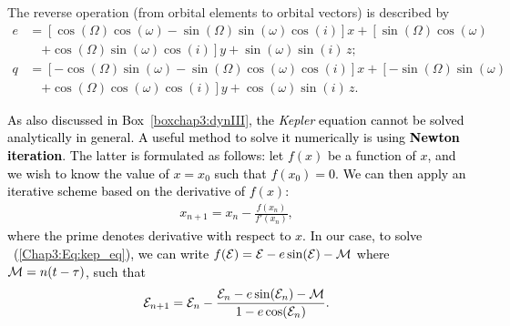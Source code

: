 \documentclass[main.tex]{subfiles}
\begin{document}
\begin{tcolorbox}[sharp corners, colback=green!30, colframe=green!80!blue, title=Box \refstepcounter{educhap3}\label{boxchap3:dynIV}\ref{boxchap3:dynIV} -- Orbital Dynamics IV]
{%
The reverse operation (from orbital elements to orbital vectors) is described by
\begin{subequations}
\label{Chap3:Eq:elements_to_vec}
\begin{align}
\nonumber \unit{e} &= \left [ \cos(\Omega) \cos(\omega) - \sin(\Omega) \sin(\omega) \cos(i) \right ] \unit{x} + \left [ \sin(\Omega) \cos(\omega) \right. \\
&\quad \left. + \cos(\Omega) \sin(\omega) \cos(i) \right ] \unit{y} + \sin(\omega) \sin(i) \, \unit{z}; \\
\nonumber \unit{q} &= \left [ -\cos(\Omega) \sin(\omega) - \sin(\Omega) \cos(\omega) \cos(i) \right ] \unit{x} + \left [ -\sin(\Omega) \sin(\omega) \right. \\
&\quad \left. + \cos(\Omega) \cos(\omega) \cos(i) \right ] \unit{y} + \cos(\omega) \sin(i) \, \unit{z}.
\end{align}
\end{subequations}
}
\end{tcolorbox}

\begin{tcolorbox}[sharp corners, colback=green!30, colframe=green!80!blue, title=Box \ref{boxchap3:dynIV} -- Orbital Dynamics IV (continued)]
\par \textcolor{black}{As also discussed in Box~\ref{boxchap3:dynIII}, the {\it Kepler} equation cannot be solved analytically in general. A useful method to solve it numerically is using {\bf Newton iteration}. The latter is formulated as follows: let $f(x)$ be a function of $x$, and we wish to know the value of $x=x_0$ such that $f(x_0)=0$. We can then apply an iterative scheme based on the derivative of $f(x)$: 
\begin{align}
x_{n+1} = x_n - \frac{f(x_n)}{f'(x_n)},
\end{align}
where the prime denotes derivative with respect to $x$. In our case, to solve \Eq~(\ref{Chap3:Eq:kep_eq}), we can write $f(\mathcal{E}) = \mathcal{E} - e \sin(\mathcal{E}) - \mathcal{M}$ where $\mathcal{M} = n(t-\tau)$, such that
\begin{align}
\mathcal{E}_{n+1} = \mathcal{E}_n - \frac{\mathcal{E}_n - e \sin(\mathcal{E}_n) - \mathcal{M}}{1 - e \cos(\mathcal{E}_n)}.
\end{align}
}
\end{tcolorbox}
\end{document}
